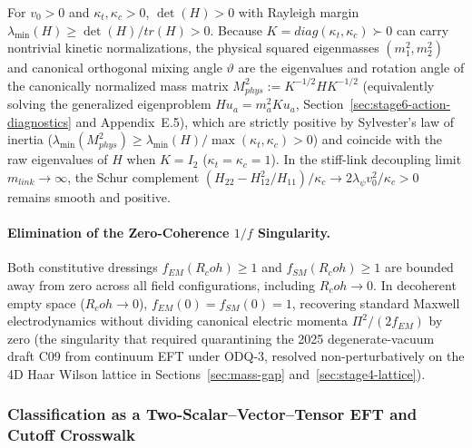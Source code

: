 \documentclass[american,11pt,letterpaper]{article}
\newcommand{\Rcoh}{R_{\mathrm{coh}}}
\def\mathrm#1{#1}%
\def\texttt#1{#1}%
\def\emph#1{#1}%
\def\Rcoh{R_coh}%
\begin{document}
For $v_0 > 0$ and $\kappa_t, \kappa_c > 0$, $\det(H) > 0$ with Rayleigh margin $\lambda_{\min}(H) \ge \det(H)/\mathrm{tr}(H) > 0$. Because $K = \mathrm{diag}(\kappa_t, \kappa_c) \succ 0$ can carry nontrivial kinetic normalizations, the \emph{physical squared eigenmasses} $(m_1^2, m_2^2)$ and canonical orthogonal mixing angle $\vartheta$ are the eigenvalues and rotation angle of the canonically normalized mass matrix $M_{\mathrm{phys}}^2 := K^{-1/2} H K^{-1/2}$ (equivalently solving the generalized eigenproblem $H u_a = m_a^2 K u_a$, Section~\ref{sec:stage6-action-diagnostics} and Appendix~E.5), which are strictly positive by Sylvester's law of inertia ($\lambda_{\min}(M_{\mathrm{phys}}^2) \ge \lambda_{\min}(H)/\max(\kappa_t, \kappa_c) > 0$) and coincide with the raw eigenvalues of $H$ when $K = I_2$ ($\kappa_t = \kappa_c = 1$). In the stiff-link decoupling limit $m_{\mathrm{link}} \to \infty$, the Schur complement $(H_{22} - H_{12}^2/H_{11})/\kappa_c \to 2\lambda_\psi v_0^2/\kappa_c > 0$ remains smooth and positive.

\paragraph{Elimination of the Zero-Coherence $1/f$ Singularity.}
Both constitutive dressings $f_{\mathrm{EM}}(\Rcoh) \ge 1$ and $f_{\mathrm{SM}}(\Rcoh) \ge 1$ are bounded away from zero across all field configurations, including $\Rcoh \to 0$. In decoherent empty space ($\Rcoh \to 0$), $f_{\mathrm{EM}}(0) = f_{\mathrm{SM}}(0) = 1$, recovering standard Maxwell electrodynamics without dividing canonical electric momenta $\Pi^2/(2f_{\mathrm{EM}})$ by zero (the singularity that required quarantining the 2025 degenerate-vacuum draft \texttt{C09} from continuum EFT under \texttt{ODQ-3}, resolved non-perturbatively on the 4D Haar Wilson lattice in Sections~\ref{sec:mass-gap} and~\ref{sec:stage4-lattice}).

\subsubsection{Classification as a Two-Scalar--Vector--Tensor EFT and Cutoff Crosswalk}
\end{document}
